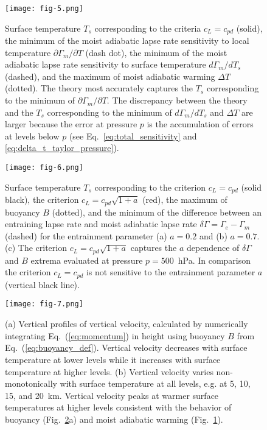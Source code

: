 \documentclass[draft]{ametsocV6.1}
\begin{document}
\begin{figure}[htbp]
 \centering
 \texttt{[image: fig-5.png]}\\
 \caption{Surface temperature $T_s$ corresponding to the criteria $c_L=c_{pd}$ (solid), the minimum of the moist adiabatic lapse rate sensitivity to local temperature $\partial \Gamma_m/\partial T$ (dash dot), the minimum of the moist adiabatic lapse rate sensitivity to surface temperature $d \Gamma_m/dT_s$ (dashed), and the maximum of moist adiabatic warming $\Delta T$ (dotted). The theory most accurately captures the $T_s$ corresponding to the minimum of $\partial \Gamma_m /\partial T$. The discrepancy between the theory and the $T_s$ corresponding to the minimum of $d\Gamma_m/dT_s$ and $\Delta T$ are larger because the error at pressure $p$ is the accumulation of errors at levels below $p$ (see Eq.~\ref{eq:total_sensitivity} and \ref{eq:delta_t_taylor_pressure}).}\label{fig:fig-5}
\end{figure}

\begin{figure}[htbp]
 \centering
 \texttt{[image: fig-6.png]}\\
 \caption{Surface temperature $T_s$ corresponding to the criterion $c_L=c_{pd}$ (solid black), the criterion $c_L=c_{pd}\sqrt{1+a}$ (red), the maximum of buoyancy $B$ (dotted), and the minimum of the difference between an entraining lapse rate and moist adiabatic lapse rate $\delta \Gamma = \Gamma_e - \Gamma_m$ (dashed) for the entrainment parameter (a) $a=0.2$ and (b) $a=0.7$. (c) The criterion $c_L=c_{pd}\sqrt{1+a}$ captures the $a$ dependence of $\delta \Gamma$ and $B$ extrema evaluated at pressure $p=500$~hPa. In comparison the criterion $c_L=c_{pd}$ is not sensitive to the entrainment parameter $a$ (vertical black line).}\label{fig:fig-6}
\end{figure}

\begin{figure}[htbp]
 \centering
 \texttt{[image: fig-7.png]}\\
 \caption{(a) Vertical profiles of vertical velocity, calculated by numerically integrating Eq.~(\ref{eq:momentum}) in height using buoyancy $B$ from Eq.~(\ref{eq:buoyancy_def}). Vertical velocity decreases with surface temperature at lower levels while it increases with surface temperature at higher levels. (b) Vertical velocity varies non-monotonically with surface temperature at all levels, e.g. at 5, 10, 15, and 20~km. Vertical velocity peaks at warmer surface temperatures at higher levels consistent with the behavior of buoyancy (Fig.~\ref{fig:fig-6}a) and moist adiabatic warming (Fig.~\ref{fig:fig-5}).}\label{fig:fig-7}
\end{figure}
\end{document}
